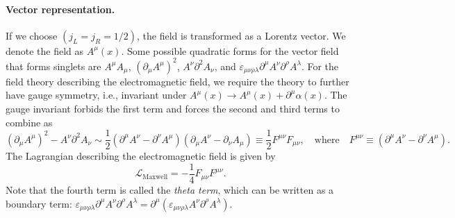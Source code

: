 \documentclass[aps,prb,superscriptaddress,nofootinbib]{revtex4}
\begin{document}
\paragraph*{Vector representation.}
If we choose $(j_L=j_R=1/2)$, the field is transformed as a Lorentz vector.
We denote the field as $A^\mu(x)$.
Some possible quadratic forms for the vector field that forms singlets are $A^\mu A_\mu$, $(\partial_\mu A^\mu)^2$, $A^\nu \partial^2 A_\nu$, and $\varepsilon_{\mu\nu\rho\lambda} \partial^\mu A^\nu \partial^\rho A^\lambda$.
For the field theory describing the electromagnetic field, we require the theory to further have gauge symmetry, i.e., invariant under $A^\mu(x) \rightarrow A^\mu(x) + \partial^\mu \alpha(x)$.
The gauge invariant forbids the first term and forces the second and third terms to combine as
\begin{equation*}
	(\partial_\mu A^\mu)^2 - A^\nu \partial^2 A_\nu
	\sim \frac{1}{2}(\partial^\mu A^\nu - \partial^\nu A^\mu)(\partial_\mu A^\nu-\partial_\nu A_\mu)
	\equiv \frac{1}{2} F^{\mu\nu}F_{\mu\nu},
	\quad\text{where}\quad
	F^{\mu\nu}\equiv (\partial^\mu A^\nu - \partial^\nu A^\mu).
\end{equation*}
The Lagrangian describing the electromagnetic field is given by
\begin{equation}
	\mathcal{L}_{\mathrm{Maxwell}} = -\frac{1}{4}F_{\mu\nu}F^{\mu\nu}.
\end{equation}
Note that the fourth term is called the \textit{theta term}, which can be written as a boundary term: $\varepsilon_{\mu\nu\rho\lambda} \partial^\mu A^\nu \partial^\rho A^\lambda
	= \partial^\mu (\varepsilon_{\mu\nu\rho\lambda} A^\nu \partial^\rho A^\lambda)$.
\end{document}
